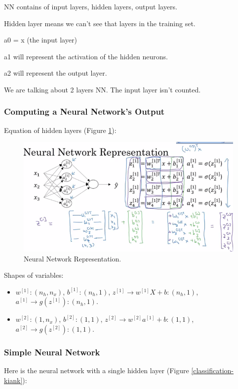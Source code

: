 NN contains of input layers, hidden layers, output layers.

Hidden layer means we can't see that layers in the training set.

a0 = x (the input layer)

a1 will represent the activation of the hidden neurons.

a2 will represent the output layer.

We are talking about 2 layers NN. The input layer isn't counted.

\subsubsection{Computing a Neural Network's Output}
Equation of hidden layers (Figure \ref{nn-figure}):

\begin{figure}[!htbp]
    \centering
    \includegraphics[width=1.0\textwidth, trim={0 0 0 50}, clip]{img/c1/nn-figure.png}
    \caption{Neural Network Representation.}
    \label{nn-figure}
\end{figure}

Shapes of variables:

\begin{itemize}
    \item $w^{[1]}: (n_h, n_x)$, $b^{[1]}: (n_h, 1)$, $z^[1] \to w^{[1]} X + b: (n_h, 1)$, $a^{[1]} \to g(z^{[1]}): (n_h, 1)$.
    \item $w^{[2]}: (1, n_x)$, $b^{[2]}: (1, 1)$, $z^[2] \to w^{[2]} a^{[1]} + b: (1, 1)$, $a^{[2]} \to g(z^{[2]}): (1, 1)$.
\end{itemize}


\subsubsection{Simple Neural Network}
Here is the neural network with a single hidden layer (Figure \ref{classification-kiank}):

